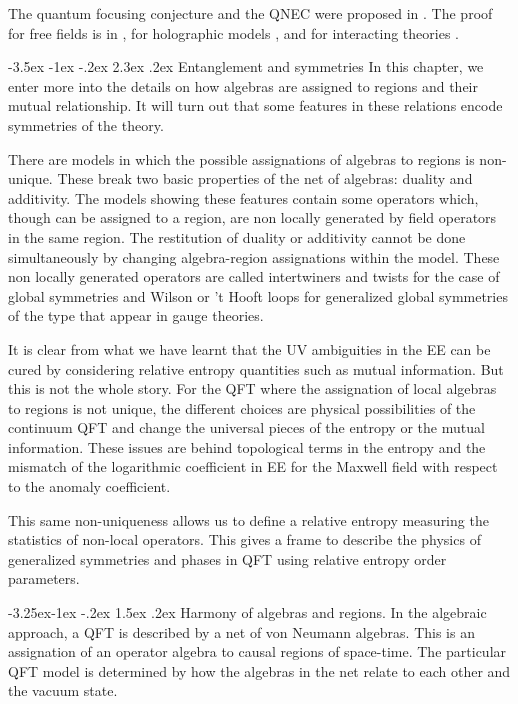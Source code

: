 \documentclass[11pt,a4paper]{article}
\makeatletter
\renewcommand\section{\@startsection {section}{1}{\z@}%
                                 {-3.5ex \@plus -1ex \@minus -.2ex}%
                                   {2.3ex \@plus.2ex}%
                                   {\normalfont\large\bfseries}}
\renewcommand\subsection{\@startsection{subsection}{2}{\z@}%
                                   {-3.25ex\@plus -1ex \@minus -.2ex}%
                                     {1.5ex \@plus .2ex}%
                                     {\normalfont\bfseries}}
\numberwithin{equation}{section}
\makeatother
\begin{document}
The quantum focusing conjecture and the QNEC were proposed in \cite{Bousso:2015mna}. The proof for free fields is in \cite{Bousso:2015wca}, for holographic models  \cite{Koeller:2015qmn,Leichenauer:2018obf}, and for interacting theories \cite{Balakrishnan:2017bjg,Balakrishnan:2019gxl}. 
 
\newpage

\section{Entanglement and symmetries}
In this chapter, we enter more into the details on how algebras are assigned to regions and their mutual relationship. It will turn out that some features in these relations encode symmetries of the theory.  

There are models in which the possible assignations of algebras to regions is non-unique. These break two basic properties of the net of algebras: duality and additivity. The models showing these features contain some operators which, though can be assigned to a region, are non locally generated by field operators in the same region.  The restitution of duality or additivity cannot be done simultaneously by changing algebra-region assignations within the model. These non locally generated operators are called intertwiners and twists for the case of global symmetries and Wilson or 't Hooft loops for generalized global symmetries of the type that appear in gauge theories.

It is clear from what we have learnt that the UV ambiguities in the EE can be cured by considering relative entropy quantities such as mutual information. But this is not the whole story. For the QFT where the assignation of local algebras to regions is not unique, the different choices are physical possibilities of the continuum QFT and change the universal pieces of the entropy or the mutual information. These issues are behind topological terms in the entropy and the mismatch of the logarithmic coefficient in EE for the Maxwell field with respect to the anomaly coefficient. 

This same non-uniqueness allows us to define a relative entropy measuring the statistics of non-local operators. This gives a frame to describe the physics of generalized symmetries and phases in QFT using relative entropy order parameters. 
 

\subsection{Harmony of algebras and regions. }
In the algebraic approach, a QFT is described by a net of von Neumann algebras. This is an assignation of an operator algebra to causal regions of space-time. The particular QFT model is determined by how the algebras in the net relate to each other and the vacuum state.
\end{document}
